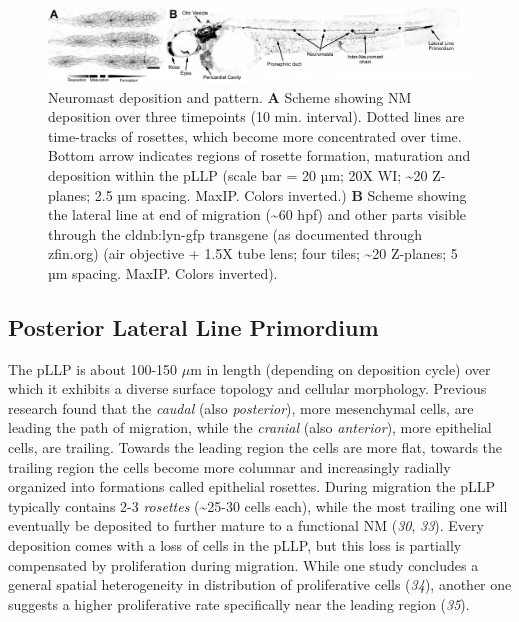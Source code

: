 \documentclass[11pt,singlespacinge,twoside]{reedthesis} %
\theoremstyle{definition}
\theoremstyle{definition}
\theoremstyle{definition}
\theoremstyle{remark}
\begin{document}
\begin{figure}

{\centering \includegraphics[width=0.95\linewidth]{figures/intro/ll_gfp} 

}

\caption[Neuromast deposition and pattern]{Neuromast deposition and pattern. \textbf{A} Scheme showing NM deposition over three timepoints (10 min. interval). Dotted lines are time-tracks of rosettes, which become more concentrated over time. Bottom arrow indicates regions of rosette formation, maturation and deposition within the pLLP (scale bar = 20 µm; 20X WI; \textasciitilde20 Z-planes; 2.5 µm spacing. MaxIP. Colors inverted.) \textbf{B} Scheme showing the lateral line at end of migration (\textasciitilde60 hpf) and other parts visible through the cldnb:lyn-gfp transgene (as documented through zfin.org) (air objective + 1.5X tube lens; four tiles; \textasciitilde20 Z-planes; 5 µm spacing. MaxIP. Colors inverted).}\label{fig:llgfp}
\end{figure}
\hypertarget{posterior-lateral-line-primordium}{%
\subsection{Posterior Lateral Line Primordium}\label{posterior-lateral-line-primordium}}

The pLLP is about 100-150 \(\mu\)m in length (depending on deposition cycle) over which it exhibits a diverse surface topology and cellular morphology. Previous research found that the \emph{caudal} (also \emph{posterior}), more mesenchymal cells, are leading the path of migration, while the \emph{cranial} (also \emph{anterior}), more epithelial cells, are trailing. Towards the leading region the cells are more flat, towards the trailing region the cells become more columnar and increasingly radially organized into formations called epithelial rosettes. During migration the pLLP typically contains 2-3 \emph{rosettes} (\textasciitilde25-30 cells each), while the most trailing one will eventually be deposited to further mature to a functional NM (\emph{30}, \emph{33}). Every deposition comes with a loss of cells in the pLLP, but this loss is partially compensated by proliferation during migration. While one study concludes a general spatial heterogeneity in distribution of proliferative cells (\emph{34}), another one suggests a higher proliferative rate specifically near the leading region (\emph{35}).
\end{document}

